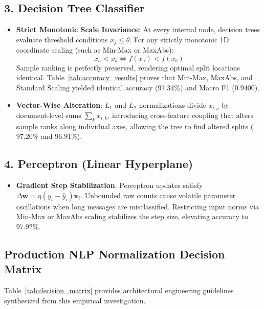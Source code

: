 \documentclass[12pt]{article}
\begin{document}
\subsection{3. Decision Tree Classifier}
\begin{itemize}
    \item \textbf{Strict Monotonic Scale Invariance}: At every internal node, decision trees evaluate threshold conditions $x_j \le \theta$. For any strictly monotonic 1D coordinate scaling (such as Min-Max or MaxAbs):
    \begin{equation}
        x_a < x_b \iff f(x_a) < f(x_b)
    \end{equation}
    Sample ranking is perfectly preserved, rendering optimal split locations identical. Table~\ref{tab:accuracy_results} proves that Min-Max, MaxAbs, and Standard Scaling yielded identical accuracy ($97.34\%$) and Macro F1 ($0.9400$).
    \item \textbf{Vector-Wise Alteration}: $L_1$ and $L_2$ normalizations divide $x_{i,j}$ by document-level sums $\sum_k x_{i,k}$, introducing cross-feature coupling that alters sample ranks along individual axes, allowing the tree to find altered splits ($97.20\%$ and $96.91\%$).
\end{itemize}

\subsection{4. Perceptron (Linear Hyperplane)}
\begin{itemize}
    \item \textbf{Gradient Step Stabilization}: Perceptron updates satisfy $\Delta \mathbf{w} = \eta (y_i - \hat{y}_i) \mathbf{x}_i$. Unbounded raw counts cause volatile parameter oscillations when long messages are misclassified. Restricting input norms via Min-Max or MaxAbs scaling stabilizes the step size, elevating accuracy to $97.92\%$.
\end{itemize}

\subsection{Production NLP Normalization Decision Matrix}
Table~\ref{tab:decision_matrix} provides architectural engineering guidelines synthesized from this empirical investigation.
\end{document}
